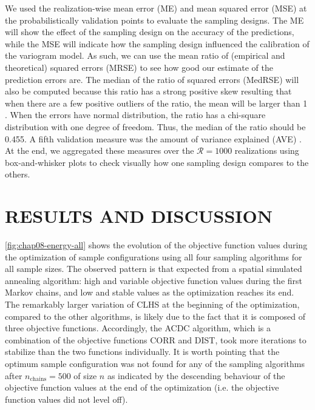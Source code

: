 We used the realization-wise mean error (ME) and mean squared error (MSE) at the probabilistically 
validation points to evaluate the sampling designs. The ME will show the effect of the sampling design 
on the accuracy of the predictions, while the MSE will indicate how the sampling design influenced the 
calibration of the variogram model. As such, we can use the mean ratio of (empirical and theoretical) squared 
errors (MRSE) to see how good our estimate of the prediction errors are. The median of the ratio of squared 
errors (MedRSE) will also be computed because this ratio has a strong positive skew resulting that when there 
are a few positive outliers of the ratio, the mean will be larger than 1 \cite{Lark2000a}. When the errors 
have normal distribution, the ratio has a chi-square distribution with one degree of freedom. Thus, the median 
of 
the ratio should be 0.455. A fifth validation measure was the amount of variance explained (AVE) . 
At the end, we aggregated these measures over the 
$\mathcal{R} = 1000$ realizations using box-and-whisker plots to check visually how one sampling 
design compares to the others.

\section{RESULTS AND DISCUSSION}

\autoref{fig:chap08-energy-all} shows the evolution of the objective function values during the optimization 
of sample configurations using all four sampling algorithms for all sample sizes. The observed pattern is that 
expected from a spatial simulated annealing algorithm: high and variable objective function values during the 
first Markov chains, and low and stable values as the optimization reaches its end. The remarkably larger 
variation of CLHS at the beginning of the optimization, compared to the other algorithms, is likely due to the 
fact that it is composed of three objective functions. Accordingly, the ACDC algorithm, which is a combination
of the objective functions CORR and DIST, took more iterations to stabilize than the two functions 
individually. 
It is worth pointing that the optimum sample configuration was not found for any of the sampling algorithms 
after $n_\text{chains} = 500$ of size $n$ as indicated by the descending behaviour of the objective function 
values at the end of the optimization (i.e. the objective function values did not level off).

